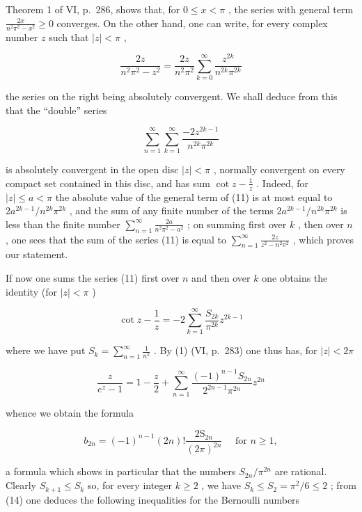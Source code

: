 Theorem 1 of VI, p.~286, shows that, for \(0 \leqslant x < \pi\) , the series with general term \(\frac{2x}{n^2\pi^2 - x^2} \geqslant 0\) converges. On the other hand, one can write, for every complex number \(z\) such that \(|z| < \pi\) ,

\[
{\frac {2 z}{n ^ {2} \pi^ {2} - z ^ {2}}} = {\frac {2 z}{n ^ {2} \pi^ {2}}} \sum_ {k = 0} ^ {\infty} {\frac {z ^ {2 k}}{n ^ {2 k} \pi^ {2 k}}}
\]

the series on the right being absolutely convergent. We shall deduce from this that the ``double'' series

\[
\sum_ {n = 1} ^ {\infty} \sum_ {k = 1} ^ {\infty} \frac {- 2 z ^ {2 k - 1}}{n ^ {2 k} \pi^ {2 k}}\tag{11}
\]

is absolutely convergent in the open disc \(|z| < \pi\) , normally convergent on every compact set contained in this disc, and has sum \(\cot z - \frac{1}{z}\) . Indeed, for \(|z| \leqslant a < \pi\) the absolute value of the general term of (11) is at most equal to \(2a^{2k-1}/n^{2k}\pi^{2k}\) , and the sum of any finite number of the terms \(2a^{2k-1}/n^{2k}\pi^{2k}\) is less than the finite number \(\sum_{n=1}^{\infty} \frac{2a}{n^2\pi^2 - a^2}\) ; on summing first over \(k\) , then over \(n\) , one sees that the sum of the series (11) is equal to \(\sum_{n=1}^{\infty} \frac{2z}{z^2 - n^2\pi^2}\) , which proves our statement.

If now one sums the series (11) first over \(n\) and then over \(k\) one obtains the identity (for \(|z| < \pi\) )

\[
\cot z - \frac {1}{z} = - 2 \sum_ {k = 1} ^ {\infty} \frac {S _ {2 k}}{\pi^ {2 k}} z ^ {2 k - 1}\tag{12}
\]

where we have put \(S_{k} = \sum_{n=1}^{\infty} \frac{1}{n^{k}}\) . By (1) (VI, p.~283) one thus has, for \(|z| < 2\pi\)

\[
\frac {z}{e ^ {z} - 1} = 1 - \frac {z}{2} + \sum_ {n = 1} ^ {\infty} \frac {(- 1) ^ {n - 1} S _ {2 n}}{2 ^ {2 n - 1} \pi^ {2 n}} z ^ {2 n}\tag{13}
\]

whence we obtain the formula

\[
b _ {2 n} = (- 1) ^ {n - 1} (2 n)! \frac {2 \mathrm{S} _ {2 n}}{(2 \pi) ^ {2 n}} \quad \text {   for   } n \geqslant 1,\tag{14}
\]

a formula which shows in particular that the numbers \(S_{2n} / \pi^{2n}\) are rational. Clearly \(S_{k + 1} \leqslant S_k\) so, for every integer \(k \geqslant 2\) , we have \(S_k \leqslant S_2 = \pi^2 / 6 \leqslant 2\) ; from (14) one deduces the following inequalities for the Bernoulli numbers

